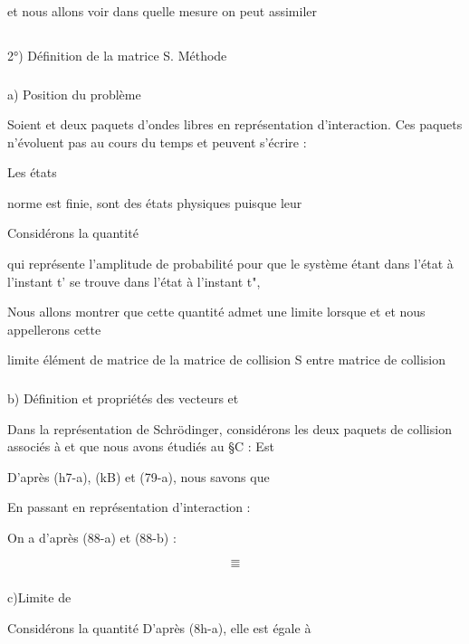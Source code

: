 et nous allons voir dans quelle mesure on peut assimiler 


\subsection{}%
2°) Définition de la matrice S. Méthode

\subsubsection{}%
a) Position du problème

Soient  et  deux paquets d'ondes libres
en représentation d'interaction. Ces paquets n'évoluent pas au
cours du temps et peuvent s'écrire :

Les états 

norme est finie,
 sont des états physiques puisque leur

Considérons la quantité

qui représente l'amplitude de probabilité pour que le système
étant dans l'état  à l'instant t' se trouve dans l'état
à l'instant t",

Nous allons montrer que cette quantité admet une
limite lorsque  et  et nous appellerons cette

limite élément de matrice de la matrice de collision S entre
 matrice de collision 

%

\subsubsection{}%
b) Définition et propriétés des vecteurs  et 

Dans la représentation de Schrödinger, considérons les deux
paquets de collision associés à  et  que nous avons
étudiés au \S C : Est

D'après (h7-a), (kB) et (79-a), nous savons que

En passant en représentation d'interaction :

On a d'après (88-a) et (88-b) :

\[
\tag{89-a}=
\]
\[
\tag{89-b}=
\]


\subsubsection{}%
c)Limite de 

Considérons la quantité
D'après (8h-a), elle est égale à

